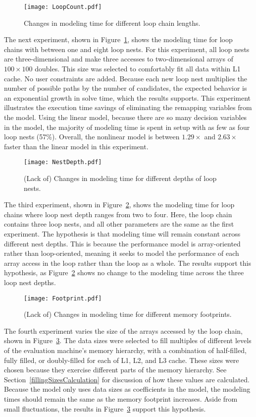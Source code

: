 \begin{figure}
	\centering
	\texttt{[image: LoopCount.pdf]}
\caption{Changes in modeling time for different loop chain lengths.}\label{LoopCount}
\end{figure}
The next experiment, shown in Figure~\ref{LoopCount}, shows the modeling time for loop chains with between one and eight loop nests.
For this experiment, all loop nests are three-dimensional and make three accesses to two-dimensional arrays of $100\times100$ doubles. 
This size was selected to comfortably fit all data within L1 cache.
No user constraints are added.
Because each new loop nest multiplies the number of possible paths by the number of candidates, the expected behavior is an exponential growth in solve time, which the results supports.
This experiment illustrates the execution time savings of eliminating the remapping variables from the model.
Using the linear model, because there are so many decision variables in the model, the majority of modeling time is spent in setup with as few as four loop nests (57\%).
Overall, the nonlinear model is between $1.29\times$ and $2.63\times$ faster than the linear model in this experiment.

\begin{figure}
	\centering
	\texttt{[image: NestDepth.pdf]}
	\caption{(Lack of) Changes in modeling time for different depths of loop nests.}\label{NestDepth}
\end{figure}
The third experiment, shown in Figure~\ref{NestDepth}, shows the modeling time for loop chains where loop nest depth ranges from two to four.
Here, the loop chain contains three loop nests, and all other parameters are the same as the first experiment.
The hypothesis is that modeling time will remain constant across different nest depths.
This is because the performance model is array-oriented rather than loop-oriented, meaning it seeks to model the performance of each array access in the loop rather than the loop as a whole.
The results support this hypothesis, as Figure~\ref{NestDepth} shows no change to the modeling time across the three loop nest depths.

\begin{figure}
	\centering
	\texttt{[image: Footprint.pdf]}
\caption{(Lack of) Changes in modeling time for different memory footprints.}\label{Footprint}
\end{figure}
The fourth experiment varies the size of the arrays accessed by the loop chain, shown in Figure~\ref{Footprint}.
The data sizes were selected to fill multiples of different levels of the evaluation machine's memory hierarchy, with a combination of half-filled, fully filled, or doubly-filled for each of L1, L2, and L3 cache.
These sizes were chosen because they exercise different parts of the memory hierarchy.
See Section~\ref{fillingSizesCalculation} for discussion of how these values are calculated.
Because the model only uses data sizes as coefficients in the model, the modeling times should remain the same as the memory footprint increases.
Aside from small fluctuations, the results in Figure~\ref{Footprint} support this hypothesis.

